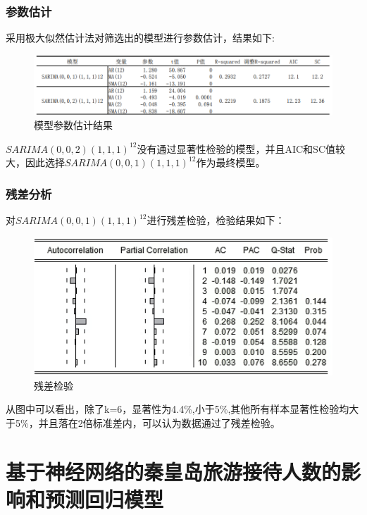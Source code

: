 		\subsubsection{参数估计}
		采用极大似然估计法对筛选出的模型进行参数估计，结果如下:
		\begin{figure}[htbp]
			\centering
			\includegraphics[scale=0.7,angle=0]{images/11.png}
			\caption{模型参数估计结果}
			\label{11}
		\end{figure}

	$SARIMA(0,0,2)(1,1,1)^{12}$没有通过显著性检验的模型，并且AIC和SC值较大，因此选择$SARIMA(0,0,1)(1,1,1)^{12}$作为最终模型。
		\subsubsection{残差分析}
		对$SARIMA(0,0,1)(1,1,1)^{12}$进行残差检验，检验结果如下：
		\begin{figure}[htbp]
			\centering
			\includegraphics[scale=0.8,angle=0]{images/12.png}
			\caption{残差检验}
			\label{12}
		\end{figure}
	
	从图中可以看出，除了k=6，显著性为4.4\%,小于5\%,其他所有样本显著性检验均大于5\%，并且落在2倍标准差内，可以认为数据通过了残差检验。
		
		
\section{基于神经网络的秦皇岛旅游接待人数的影响和预测回归模型}
